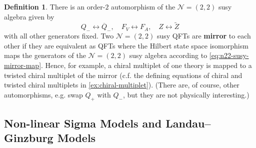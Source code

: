 \documentclass{report}
\theoremstyle{plain}
\theoremstyle{definition}
\newtheorem{definition}[theorem]{Definition}
\theoremstyle{remark}
\newcommand{\cN}{\mathcal{N}}
\newcommand{\cnj}{\overline}
\begin{document}
\begin{definition}
  There is an order-$2$ automorphism of the $\cN=(2,2)$ susy algebra
  given by
  \begin{equation} \label{eq:n22-susy-mirror-map}
    Q_- \longleftrightarrow \cnj Q_-, \quad F_V \longleftrightarrow F_A, \quad Z \longleftrightarrow \tilde Z
  \end{equation}
  with all other generators fixed. Two $\cN=(2,2)$ susy QFTs are {\bf
    mirror} to each other if they are equivalent as QFTs where the
  Hilbert state space isomorphism maps the generators of the
  $\cN=(2,2)$ susy algebra according to \ref{eq:n22-susy-mirror-map}.
  Hence, for example, a chiral multiplet of one theory is mapped to a
  twisted chiral multiplet of the mirror (c.f. the defining equations
  of chiral and twisted chiral multiplets in
  \ref{ex:chiral-multiplet}). (There are, of course, other
  automorphisms, e.g. swap $Q_+$ with $Q_-$, but they are not
  physically interesting.)
\end{definition}

\subsection{Non-linear Sigma Models and Landau--Ginzburg Models}
\end{document}
